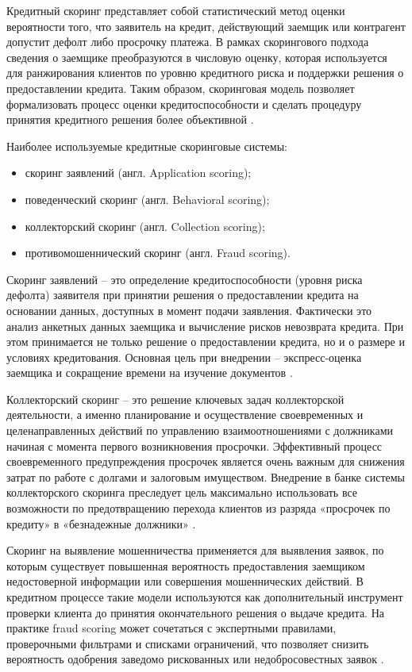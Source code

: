 Кредитный скоринг представляет собой статистический метод оценки вероятности того, что заявитель на кредит, действующий заемщик или контрагент допустит дефолт либо просрочку платежа. В рамках скорингового подхода сведения о заемщике преобразуются в числовую оценку, которая используется для ранжирования клиентов по уровню кредитного риска и поддержки решения о предоставлении кредита. Таким образом, скоринговая модель позволяет формализовать процесс оценки кредитоспособности и сделать процедуру принятия кредитного решения более объективной \cite{WorldBankCreditScoring}.

Наиболее используемые кредитные скоринговые системы:
\begin{itemize}
  \item скоринг заявлений (англ. Application scoring);
  \item поведенческий скоринг (англ. Behavioral scoring);
  \item коллекторский скоринг (англ. Collection scoring);
  \item противомошеннический скоринг (англ. Fraud scoring).
\end{itemize}

Скоринг заявлений -- это определение кредитоспособности (уровня риска дефолта) заявителя при принятии решения о предоставлении кредита на основании данных, доступных в момент подачи заявления. Фактически это анализ анкетных данных заемщика и вычисление рисков невозврата кредита. При этом принимается не только решение о предоставлении кредита, но и о размере и условиях кредитования. Основная цель при внедрении -- экспресс-оценка заемщика и сокращение времени на изучение документов \cite{Tkachev}.

Коллекторский скоринг -- это решение ключевых задач коллекторской деятельности, а именно планирование и осуществление своевременных и целенаправленных действий по управлению взаимоотношениями с должниками начиная с момента первого возникновения просрочки. Эффективный процесс своевременного предупреждения просрочек является очень важным для снижения затрат по работе с долгами и залоговым имуществом. Внедрение в банке системы коллекторского скоринга преследует цель максимально использовать все возможности по предотвращению перехода клиентов из разряда «просрочек по кредиту» в «безнадежные должники» \cite{Lyandres}.

Скоринг на выявление мошенничества применяется для выявления заявок, по которым существует повышенная вероятность предоставления заемщиком недостоверной информации или совершения мошеннических действий. В кредитном процессе такие модели используются как дополнительный инструмент проверки клиента до принятия окончательного решения о выдаче кредита. На практике fraud scoring может сочетаться с экспертными правилами, проверочными фильтрами и списками ограничений, что позволяет снизить вероятность одобрения заведомо рискованных или недобросовестных заявок \cite{ThomasCreditScoringFraud}.

